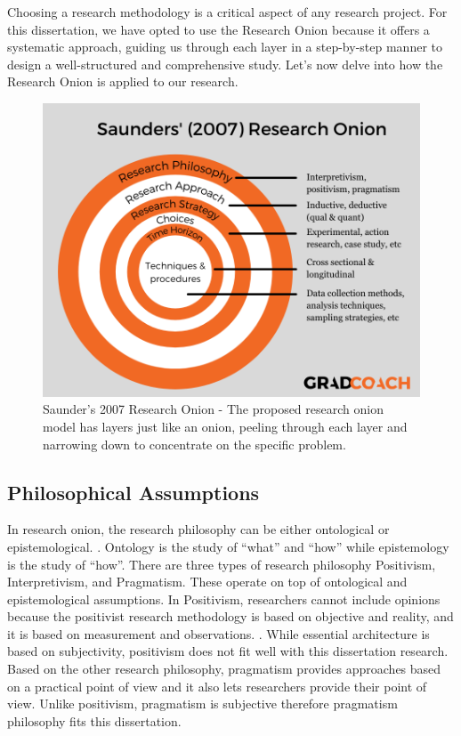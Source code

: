 \documentclass{article}
\begin{document}
Choosing a research methodology is a critical aspect of any research project. For this dissertation, we have opted to use the Research Onion because it offers a systematic approach, guiding us through each layer in a step-by-step manner to design a well-structured and comprehensive study. Let's now delve into how the Research Onion is applied to our research.

\begin{figure}[ht!]
    \centering
    \includegraphics[scale=0.4]{onion-research}
    \caption{Saunder's 2007 Research Onion - The proposed research onion model has layers just like an onion, peeling through each layer and narrowing down to concentrate on the specific problem. \parencite{gradcoach}}
    \label{fig: onion research}
\end{figure}

\maketitle
\subsection{Philosophical Assumptions}
In research onion, the research philosophy can be either ontological or epistemological. \parencite{alababneh2020}. Ontology is the study of “what” and “how” while epistemology is the study of “how”. There are three types of research philosophy Positivism, Interpretivism, and Pragmatism. These operate on top of ontological and epistemological assumptions. In Positivism, researchers cannot include opinions because the positivist research methodology is based on objective and reality, and it is based on measurement and observations. \parencite{goldkuhl2012}. While essential architecture is based on subjectivity, positivism does not fit well with this dissertation research. Based on the other research philosophy, pragmatism provides approaches based on a practical point of view and it also lets researchers provide their point of view. Unlike positivism, pragmatism is subjective therefore pragmatism philosophy fits this dissertation.
\end{document}

